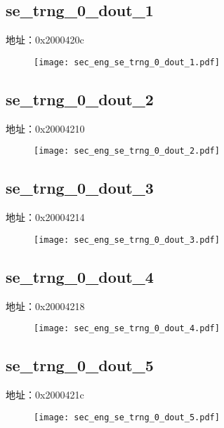 \subsection{se\_trng\_0\_dout\_1}
\label{sec_eng-se-trng-0-dout-1}
地址：0x2000420c
 \begin{figure}[H]
\texttt{[image: sec\_eng\_se\_trng\_0\_dout\_1.pdf]}
\end{figure}

\subsection{se\_trng\_0\_dout\_2}
\label{sec_eng-se-trng-0-dout-2}
地址：0x20004210
 \begin{figure}[H]
\texttt{[image: sec\_eng\_se\_trng\_0\_dout\_2.pdf]}
\end{figure}

\subsection{se\_trng\_0\_dout\_3}
\label{sec_eng-se-trng-0-dout-3}
地址：0x20004214
 \begin{figure}[H]
\texttt{[image: sec\_eng\_se\_trng\_0\_dout\_3.pdf]}
\end{figure}

\subsection{se\_trng\_0\_dout\_4}
\label{sec_eng-se-trng-0-dout-4}
地址：0x20004218
 \begin{figure}[H]
\texttt{[image: sec\_eng\_se\_trng\_0\_dout\_4.pdf]}
\end{figure}

\subsection{se\_trng\_0\_dout\_5}
\label{sec_eng-se-trng-0-dout-5}
地址：0x2000421c
 \begin{figure}[H]
\texttt{[image: sec\_eng\_se\_trng\_0\_dout\_5.pdf]}
\end{figure}

